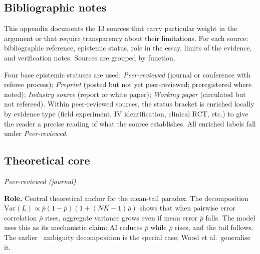 \documentclass[11pt,a4paper]{article}
\begin{document}
\begin{appendices}

\section{Bibliographic notes}\label{app:biblio}

This appendix documents the 13 sources that carry particular weight in the
argument or that require transparency about their limitations. For each
source: bibliographic reference, epistemic status, role in the essay, limits
of the evidence, and verification notes. Sources are grouped by function.

Four base epistemic statuses are used: \textit{Peer-reviewed} (journal or
conference with referee process); \textit{Preprint} (posted but not yet
peer-reviewed; preregistered where noted); \textit{Industry source} (report
or white paper); \textit{Working paper} (circulated but not refereed).
Within peer-reviewed sources, the status bracket is enriched locally by
evidence type (field experiment, IV identification, clinical RCT, etc.) to
give the reader a precise reading of what the source establishes. All
enriched labels fall under \textit{Peer-reviewed}.

\subsection{Theoretical core}\label{app:bib:theory}

\begin{description}[style=nextline, leftmargin=0pt, labelindent=0pt]

\item[\cite{wood_jmlr_2023} --- Wood et al.\ (2023), JMLR.]
\hfill\textit{Peer-reviewed (journal)}

\textbf{Role.}
Central theoretical anchor for the mean-tail paradox. The decomposition
$\text{Var}(L) \propto \bar{p}(1{-}\bar{p})(1 + (NK{-}1)\bar{\rho})$
shows that when pairwise error correlation $\bar{\rho}$ rises, aggregate
variance grows even if mean error $\bar{p}$ falls. The model uses this as
its mechanistic claim: AI reduces $\bar{p}$ while $\bar{\rho}$ rises, and
the tail follows. The earlier~\cite{krogh_nips_1995} ambiguity decomposition
is the special case; Wood et al.\ generalise it.


\end{description}
\end{appendices}
\end{document}
